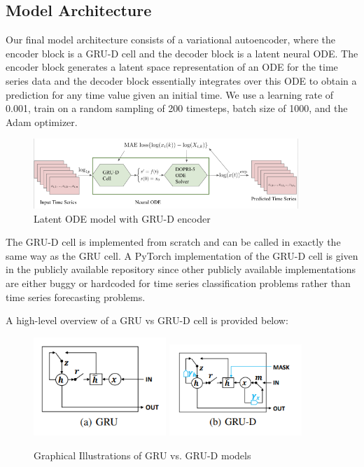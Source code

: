 \documentclass{article} %
\begin{document}
\subsection{Model Architecture}

Our final model architecture consists of a variational autoencoder, where the encoder block is a GRU-D cell and the decoder block is a latent neural ODE. The encoder block generates a latent space representation of an ODE for the time series data and the decoder block essentially integrates over this ODE to obtain a prediction for any time value given an initial time. We use a learning rate of 0.001, train on a random sampling of 200 timesteps, batch size of 1000, and the Adam optimizer.

\begin{figure}[h]
  \centering
  \includegraphics[width=10cm]{architecture.png}
  \caption{Latent ODE model with GRU-D encoder}
\end{figure}

The GRU-D cell is implemented from scratch and can be called in exactly the same way as the GRU cell. A PyTorch implementation of the GRU-D cell is given in the publicly available repository since other publicly available implementations are either buggy or hardcoded for time series classification problems rather than time series forecasting problems.

A high-level overview of a GRU vs GRU-D cell is provided below:
\begin{figure}[h]
  \centering 
  \includegraphics[width=5cm]{gru.png}
  \includegraphics[width=5cm]{grud.png}
  \caption{Graphical Illustrations of GRU vs. GRU-D models}
\end{figure}
\end{document}
